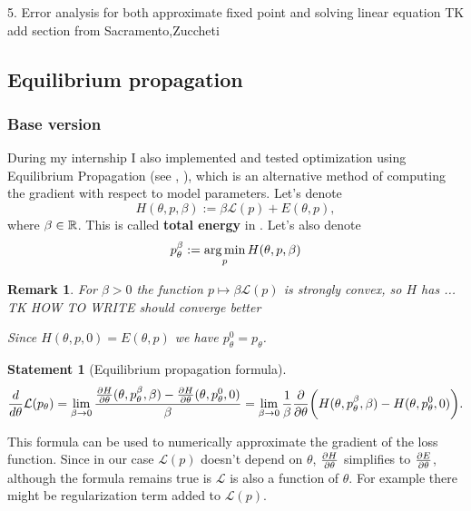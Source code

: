\documentclass[a4paper,10pt]{report}
\newtheorem{statement}{Statement}
\newtheorem{remark}{Remark}
\begin{document}
5. Error analysis for both approximate fixed point and solving linear equation
TK add section from Sacramento,Zuccheti
\subsection{ Equilibrium propagation}

\subsubsection{Base version}
During my internship I also implemented and tested optimization using Equilibrium Propagation (see \cite{eqprop}, \cite{zucchet2022beyond}), which is an alternative method of computing the gradient with respect to model parameters.
Let's denote
\begin{equation}
H(\theta, p, \beta) := \beta \mathcal{L}(p) + E(\theta, p),
\end{equation}
where $\beta \in \mathbb{R}$.
 This is called \textbf{total energy} in \cite{eqprop}. Let's also denote
\begin{equation}
p_{\theta}^{\beta}:=\operatorname*{arg\,min}_p H(\theta, p, \beta)
\end{equation}
\begin{remark}
 For $\beta>0$ the function $p \mapsto \beta \mathcal{L}(p)$ is strongly convex, so $H$ has ... TK HOW TO WRITE should converge better

 Since $H(\theta,p,0) = E(\theta,p)$ we have $p_{\theta}^{0}=p_{\theta}$.
 \end{remark}





\begin{statement}[Equilibrium propagation formula]
 \begin{equation}
 \frac{d}{d\theta} \mathcal{L}(p_\theta) = \lim_{\beta \to 0} \frac{\frac{\partial H}{\partial \theta}(\theta, p_\theta^\beta, \beta)-\frac{\partial H}{\partial \theta}(\theta, p_\theta^0, 0) }{\beta} = \lim_{\beta \to 0}\frac{1}{\beta} \frac{\partial }{\partial \theta} \bigg(H(\theta, p_\theta^\beta,\beta) - H(\theta, p_\theta^0, 0)\bigg).
\end{equation}
\end{statement}
This formula can be used to numerically approximate the gradient of the loss function.
Since in our case $\mathcal{L}(p)$ doesn't depend on $\theta$, $\frac{\partial H}{\partial \theta}$ simplifies to $\frac{\partial E}{\partial \theta}$, although the formula remains true is $\mathcal{L}$ is also a function of $\theta$. For example there might be regularization term added to $\mathcal{L}(p)$.
\end{document}
